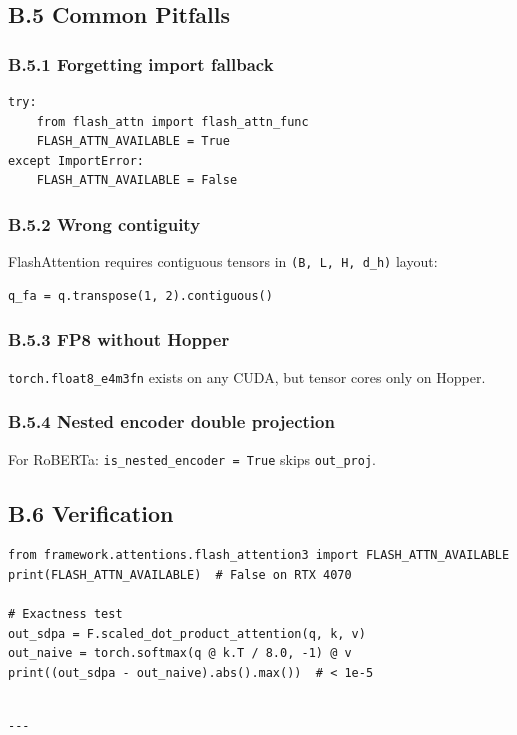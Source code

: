 \subsection{B.5 Common Pitfalls}

\subsubsection{B.5.1 Forgetting import fallback}
\begin{lstlisting}
try:
    from flash_attn import flash_attn_func
    FLASH_ATTN_AVAILABLE = True
except ImportError:
    FLASH_ATTN_AVAILABLE = False
\end{lstlisting}

\subsubsection{B.5.2 Wrong contiguity}
FlashAttention requires contiguous tensors in \texttt{(B, L, H, d\_h)} layout:
\begin{lstlisting}
q_fa = q.transpose(1, 2).contiguous()
\end{lstlisting}

\subsubsection{B.5.3 FP8 without Hopper}
\texttt{torch.float8\_e4m3fn} exists on any CUDA, but tensor cores only on Hopper.

\subsubsection{B.5.4 Nested encoder double projection}
For RoBERTa: \texttt{is\_nested\_encoder = True} skips \texttt{out\_proj}.

\subsection{B.6 Verification}

\begin{lstlisting}
from framework.attentions.flash_attention3 import FLASH_ATTN_AVAILABLE
print(FLASH_ATTN_AVAILABLE)  # False on RTX 4070

# Exactness test
out_sdpa = F.scaled_dot_product_attention(q, k, v)
out_naive = torch.softmax(q @ k.T / 8.0, -1) @ v
print((out_sdpa - out_naive).abs().max())  # < 1e-5
\end{lstlisting}
\begin{lstlisting}

---
\end{lstlisting}